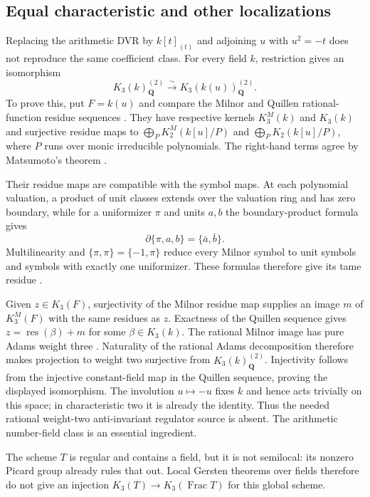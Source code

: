 \documentclass[11pt,a4paper]{amsart}
\numberwithin{equation}{section}
\theoremstyle{definition}
\theoremstyle{remark}
\newcommand{\Q}{\mathbf Q}
\newcommand{\Frac}{\operatorname{Frac}}
\begin{document}
\subsection{Equal characteristic and other localizations}
Replacing the arithmetic DVR by $k[t]_{(t)}$ and adjoining $u$
with $u^2=-t$ does not reproduce the same coefficient class.
For every field $k$, restriction gives an isomorphism
\[
 K_3(k)_{\Q}^{(2)}
       \xrightarrow{\sim}K_3(k(u))_{\Q}^{(2)}.
\]
To prove this, put $F=k(u)$ and compare the Milnor and Quillen
rational-function residue sequences
\cite[III, Theorem~7.4; V, Corollary~6.7.1]{Weibel}.
They have respective kernels $K_3^M(k)$ and $K_3(k)$ and
surjective residue maps to
$\bigoplus_P K_2^M(k[u]/P)$ and
$\bigoplus_P K_2(k[u]/P)$, where $P$ runs over monic
irreducible polynomials.
The right-hand terms agree by Matsumoto's theorem
\cite[III, Theorem~6.1]{Weibel}.

Their residue maps are compatible with the symbol maps.
At each polynomial valuation, a product of unit classes extends
over the valuation ring and has zero boundary, while for a
uniformizer $\pi$ and units $a,b$ the boundary-product formula gives
\[
 \partial\{\pi,a,b\}=\{\bar a,\bar b\}.
\]
Multilinearity and $\{\pi,\pi\}=\{-1,\pi\}$ reduce every Milnor
symbol to unit symbols and symbols with exactly one uniformizer.
These formulas therefore give its tame residue
\cite[III, Theorem~7.3; V, equation~(6.1.1),
Example~6.1.2, and Lemma~6.7.3]{Weibel}.

Given $z\in K_3(F)$, surjectivity of the Milnor residue map
supplies an image $m$ of $K_3^M(F)$ with the same residues as
$z$. Exactness of the Quillen sequence gives
$z=\operatorname{res}(\beta)+m$ for some $\beta\in K_3(k)$.
The rational Milnor image has pure Adams weight three
\cite[IV, Example~5.9.1]{Weibel}.
Naturality of the rational Adams decomposition
\cite[IV, Theorem~5.11]{Weibel} therefore makes projection
to weight two surjective from $K_3(k)_{\Q}^{(2)}$.
Injectivity follows from the injective constant-field map in
the Quillen sequence, proving the displayed isomorphism.
The involution $u\mapsto-u$ fixes $k$ and hence acts trivially
on this space; in characteristic two it is already the identity.
Thus the needed rational weight-two anti-invariant regulator
source is absent. The arithmetic number-field class is an
essential ingredient.

The scheme $T$ is regular and contains a field, but it is not semilocal: its nonzero Picard group already rules that out. Local Gersten theorems over fields therefore do not give an injection $K_3(T)\to K_3(\Frac T)$ for this global scheme.
\end{document}
